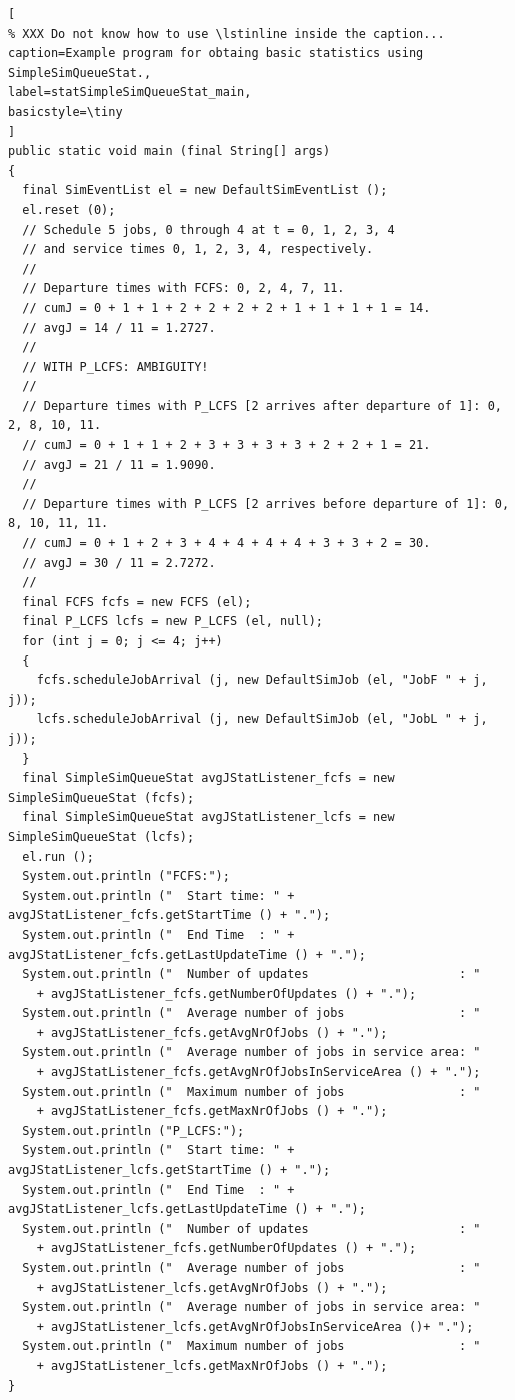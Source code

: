 \documentclass[12pt]{book}
\begin{document}
\begin{lstlisting}[
% XXX Do not know how to use \lstinline inside the caption...
caption=Example program for obtaing basic statistics using SimpleSimQueueStat.,
label=statSimpleSimQueueStat_main,
basicstyle=\tiny
]
public static void main (final String[] args)
{
  final SimEventList el = new DefaultSimEventList ();
  el.reset (0);
  // Schedule 5 jobs, 0 through 4 at t = 0, 1, 2, 3, 4
  // and service times 0, 1, 2, 3, 4, respectively.
  //
  // Departure times with FCFS: 0, 2, 4, 7, 11.
  // cumJ = 0 + 1 + 1 + 2 + 2 + 2 + 2 + 1 + 1 + 1 + 1 = 14.
  // avgJ = 14 / 11 = 1.2727.
  //
  // WITH P_LCFS: AMBIGUITY!
  //
  // Departure times with P_LCFS [2 arrives after departure of 1]: 0, 2, 8, 10, 11.
  // cumJ = 0 + 1 + 1 + 2 + 3 + 3 + 3 + 3 + 2 + 2 + 1 = 21.
  // avgJ = 21 / 11 = 1.9090.
  //
  // Departure times with P_LCFS [2 arrives before departure of 1]: 0, 8, 10, 11, 11.
  // cumJ = 0 + 1 + 2 + 3 + 4 + 4 + 4 + 4 + 3 + 3 + 2 = 30.
  // avgJ = 30 / 11 = 2.7272.    
  //
  final FCFS fcfs = new FCFS (el);
  final P_LCFS lcfs = new P_LCFS (el, null);
  for (int j = 0; j <= 4; j++)
  {
    fcfs.scheduleJobArrival (j, new DefaultSimJob (el, "JobF " + j, j));
    lcfs.scheduleJobArrival (j, new DefaultSimJob (el, "JobL " + j, j));
  }
  final SimpleSimQueueStat avgJStatListener_fcfs = new SimpleSimQueueStat (fcfs);
  final SimpleSimQueueStat avgJStatListener_lcfs = new SimpleSimQueueStat (lcfs);
  el.run ();
  System.out.println ("FCFS:");
  System.out.println ("  Start time: " + avgJStatListener_fcfs.getStartTime () + ".");
  System.out.println ("  End Time  : " + avgJStatListener_fcfs.getLastUpdateTime () + ".");
  System.out.println ("  Number of updates                     : "
    + avgJStatListener_fcfs.getNumberOfUpdates () + ".");
  System.out.println ("  Average number of jobs                : "
    + avgJStatListener_fcfs.getAvgNrOfJobs () + ".");
  System.out.println ("  Average number of jobs in service area: "
    + avgJStatListener_fcfs.getAvgNrOfJobsInServiceArea () + ".");
  System.out.println ("  Maximum number of jobs                : "
    + avgJStatListener_fcfs.getMaxNrOfJobs () + ".");
  System.out.println ("P_LCFS:");
  System.out.println ("  Start time: " + avgJStatListener_lcfs.getStartTime () + ".");
  System.out.println ("  End Time  : " + avgJStatListener_lcfs.getLastUpdateTime () + ".");
  System.out.println ("  Number of updates                     : "
    + avgJStatListener_fcfs.getNumberOfUpdates () + ".");
  System.out.println ("  Average number of jobs                : "
    + avgJStatListener_lcfs.getAvgNrOfJobs () + ".");
  System.out.println ("  Average number of jobs in service area: "
    + avgJStatListener_lcfs.getAvgNrOfJobsInServiceArea ()+ ".");
  System.out.println ("  Maximum number of jobs                : "
    + avgJStatListener_lcfs.getMaxNrOfJobs () + ".");
}
\end{lstlisting}
\end{document}
